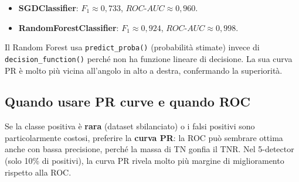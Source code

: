 \begin{exbox}
\begin{itemize}
    \item \textbf{SGDClassifier}: $F_1 \approx 0{,}733$, $ROC\text{-}AUC \approx 0{,}960$.
    \item \textbf{RandomForestClassifier}: $F_1 \approx 0{,}924$, $ROC\text{-}AUC \approx 0{,}998$.
\end{itemize}
Il Random Forest usa \texttt{predict\_proba()} (probabilità stimate) invece di \texttt{decision\_function()} perché non ha funzione lineare di decisione. La sua curva PR è molto più vicina all'angolo in alto a destra, confermando la superiorità.
\end{exbox}



\begin{center}
\end{center}

\subsection{Quando usare PR curve e quando ROC}

\begin{notebox}
Se la classe positiva è \textbf{rara} (dataset sbilanciato) o i falsi positivi sono particolarmente costosi, preferire la \textbf{curva PR}: la ROC può sembrare ottima anche con bassa precisione, perché la massa di TN gonfia il TNR. Nel 5-detector (solo 10\% di positivi), la curva PR rivela molto più margine di miglioramento rispetto alla ROC.
\end{notebox}

